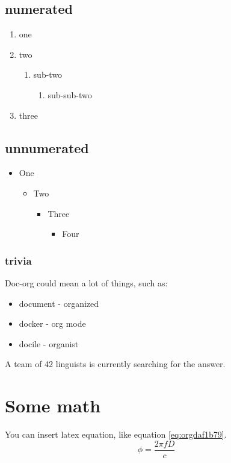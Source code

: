 \subsection{numerated}
\label{sec:orgb0e9be6}
\begin{enumerate}
\item one
\item two
\begin{enumerate}
\item sub-two
\begin{enumerate}
\item sub-sub-two
\end{enumerate}
\end{enumerate}
\item three
\end{enumerate}

\subsection{unnumerated}
\label{sec:org76dd0f3}
\begin{itemize}
\item One
\begin{itemize}
\item Two
\begin{itemize}
\item Three
\begin{itemize}
\item Four
\end{itemize}
\end{itemize}
\end{itemize}
\end{itemize}

\subsubsection{trivia}
\label{sec:orga76a990}
Doc-org could mean a lot of things, such as:
\begin{itemize}
\item document - organized
\item docker - org mode
\item docile - organist
\end{itemize}
A team of 42 linguists is currently searching for the answer.

\section{Some math}
\label{sec:org3ee65ab}
You can insert latex equation, like equation \ref{eq:orgdaf1b79}.
\begin{equation}
\label{eq:orgdaf1b79}
\phi = \frac{2\pi fD}{c}
\end{equation}


